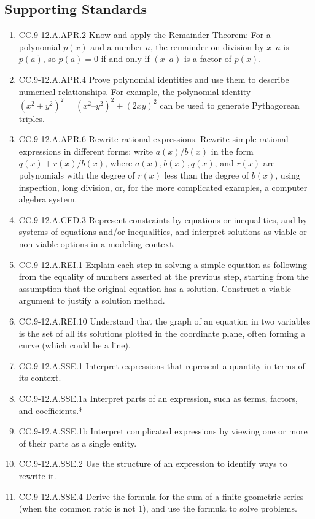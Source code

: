 \subsection*{Supporting Standards}
\begin{enumerate}
	\item CC.9-12.A.APR.2 Know and apply the Remainder Theorem: For a polynomial $p(x)$ and a number $a$, the remainder on division by $x – a$ is $p(a)$, so $p(a) = 0$ if and only if $(x – a)$ is a factor of $p(x)$.
	\item CC.9-12.A.APR.4  Prove polynomial identities and use them to describe numerical relationships. For example, the polynomial identity $(x^2 + y^2)^2 = (x^2 – y^2)^2 + (2xy)^2$ can be used to generate Pythagorean triples.
	\item CC.9-12.A.APR.6 Rewrite rational expressions. Rewrite simple rational expressions in different forms; write $a(x)/b(x)$ in the form $q(x) + r(x)/b(x)$, where $a(x), b(x), q(x)$, and $r(x)$ are polynomials with the degree of $r(x)$ less than the degree of $b(x)$, using inspection, long division, or, for the more complicated examples, a computer algebra system.
	\item CC.9-12.A.CED.3  Represent constraints by equations or inequalities, and by systems of equations and/or inequalities, and interpret solutions as viable or non-viable options in a modeling context. 
	\item CC.9-12.A.REI.1   Explain each step in solving a simple equation as following from the equality of numbers asserted at the previous step, starting from the assumption that the original equation has a solution. Construct a viable argument to justify a solution method.
	\item CC.9-12.A.REI.10  Understand that the graph of an equation in two variables is the set of all its solutions plotted in the coordinate plane, often forming a curve (which could be a line).
	\item CC.9-12.A.SSE.1  Interpret expressions that represent a quantity in terms of its context.
	\item CC.9-12.A.SSE.1a Interpret parts of an expression, such as terms, factors, and coefficients.*
	\item CC.9-12.A.SSE.1b Interpret complicated expressions by viewing one or more of their parts as a single entity. 
	\item CC.9-12.A.SSE.2  Use the structure of an expression to identify ways to rewrite it. 
	\item CC.9-12.A.SSE.4  Derive the formula for the sum of a finite geometric series (when the common ratio is not 1), and use the formula to solve problems. 

\end{enumerate}
